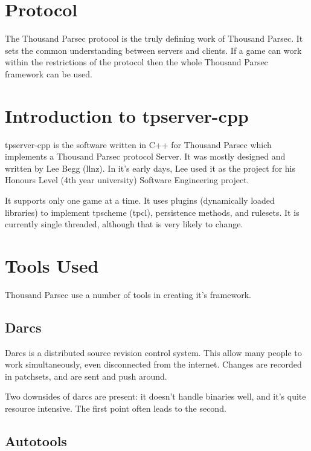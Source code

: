 \documentclass[a4paper,11pt]{report}
\begin{document}
\chapter{Protocol}
\label{chap:protocol-intro}

The Thousand Parsec protocol is the truly defining work of Thousand Parsec. It sets the common understanding between servers and clients. If a game can work within the restrictions of the protocol then the whole Thousand Parsec framework can be used.

\chapter{Introduction to tpserver-cpp}
\label{chap:tpserver-cpp-intro}
tpserver-cpp is the software written in C++ for Thousand Parsec which implements a Thousand Parsec protocol Server. It was mostly designed and written by Lee Begg (llnz). In it's early days, Lee used it as the project for his Honours Level (4th year university) Software Engineering project.

It supports only one game at a time. It uses plugins (dynamically loaded libraries) to implement tpscheme (tpcl), persistence methods, and rulesets. It is currently single threaded, although that is very likely to change.

\chapter{Tools Used}
\label{chap:tools}

Thousand Parsec use a number of tools in creating it's framework.

\section{Darcs}
\label{sec:darcs}

Darcs is a distributed source revision control system. This allow many people to work simultaneously, even disconnected from the internet. Changes are recorded in patchsets, and are sent and push around.

Two downsides of darcs are present: it doesn't handle binaries well, and it's quite resource intensive. The first point often leads to the second.

\section{Autotools}
\label{sec:autotools}
\end{document}

